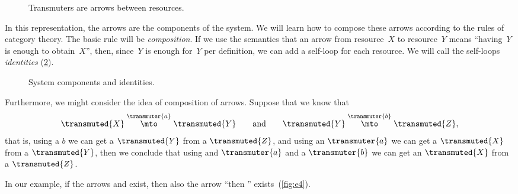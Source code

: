
\begin{figure}[h!]
  \centering
  \caption{Transmuters are arrows between resources.}
   \label{fig:e2}
\end{figure}

In this representation, the arrows are the components of the system.
We will learn how to compose these arrows according to the rules of category theory.
The basic rule will be \emph{composition}.
If we use the semantics that an arrow from resource~$X$ to resource~$Y$ means ``having~$Y$ is
enough to obtain~$X$'', then, since~$Y$ is enough for~$Y$ per definition, we can add a self-loop for each
resource. We will call the self-loops \emph{identities} (\cref{fig:e3}).

\begin{figure}[h!]
  \centering
  \caption{System components and identities. }
  \label{fig:e3}
\end{figure}


Furthermore, we might consider the idea of composition of arrows.
Suppose that we know that
\begin{equation*}
  \transmuted{X} \stackrel{\transmuter{a}}{\mto} \transmuted{Y}
  \qquad \text{and} \qquad
  \transmuted{Y} \stackrel{\transmuter{b}}{\mto} \transmuted{Z},
\end{equation*}
that is, using a $b$ we can get a $\transmuted{Y}$ from a $\transmuted{Z}$, and using an $\transmuter{a}$ we can get a $\transmuted{X}$ from a $\transmuted{Y}$,
then we conclude that using and $\transmuter{a}$ and a $\transmuter{b}$ we can get an $\transmuted{X}$ from a $\transmuted{Z}$.

In our example, if the arrows \wheels  and \motor exist, then also the arrow ``\wheels then \motor'' exists~(\cref{fig:e4}).

